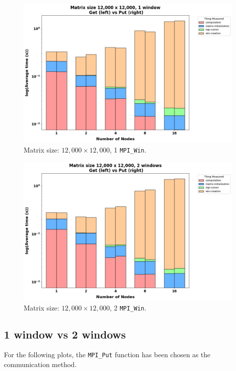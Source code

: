 \documentclass{article}
\begin{document}
    \begin{figure}
        \includegraphics[width=\textwidth]{./images/getvsput-1win-12k}
        \caption{Matrix size: $12,000 \times 12,000$, 1 \texttt{MPI\_Win}.}
        \label{fig:figure3}
    \end{figure}

    \begin{figure}
        \includegraphics[width=\textwidth]{./images/getvsput-2win-12k}
        \caption{Matrix size: $12,000 \times 12,000$, 2 \texttt{MPI\_Win}.}
        \label{fig:figure4}
    \end{figure}

    \newpage
    \subsection{1 window vs 2 windows}

    For the following plots, the \texttt{MPI\_Put} function has been chosen as the communication method.
\end{document}
